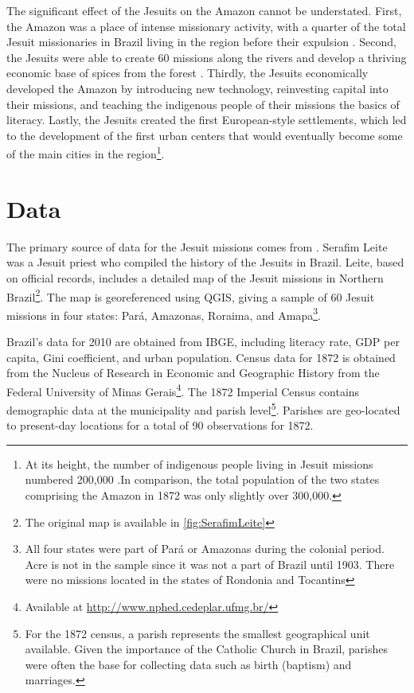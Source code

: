 \documentclass{article}
\begin{document}
The significant effect of the Jesuits on the Amazon cannot be understated. 
First, the Amazon was a place of intense missionary activity, with a quarter of the total Jesuit missionaries in Brazil living in the region before their expulsion \parencite{Bethell1984-eo}. 
Second, the Jesuits were able to create 60 missions along the rivers and develop a thriving economic base of spices from the forest \parencite{Hemming1987-vj}. 
Thirdly, the Jesuits economically developed the Amazon by introducing new technology, reinvesting capital into their missions, and teaching the indigenous people of their missions the basics of literacy. 
Lastly, the Jesuits created the first European-style settlements, which led to the development of the first urban centers that would eventually become some of the main cities in the region\footnote{
  At its height, the number of indigenous people living in Jesuit missions numbered 200,000 \parencite{Bethell1984-eo, Alden1996-id}.In comparison, the total population of the two states comprising the Amazon in 1872 was only slightly over 300,000.}. 


\section{Data}

The primary source of data for the Jesuit missions comes from \textcite{Leite1943-dy}. Serafim Leite was a Jesuit priest who compiled the history of the Jesuits in Brazil. 
Leite, based on official records, includes a detailed map of the Jesuit missions in Northern Brazil\footnote{
  The original map is available in \autoref{fig:SerafimLeite}}. 
The map is georeferenced using QGIS, giving a sample of 60 Jesuit missions in four states: Pará, Amazonas, Roraima, and Amapa\footnote{
  All four states were part of Pará or Amazonas during the colonial period. Acre is not in the sample since it was not a part of Brazil until 1903. There were no missions located in the states of Rondonia and Tocantins}.

Brazil's data for 2010 are obtained from IBGE, including literacy rate, GDP per capita, Gini coefficient, and urban population. 
Census data for 1872 is obtained from the Nucleus of Research in Economic and Geographic History from the Federal University of Minas Gerais\footnote{
  Available at \url{http://www.nphed.cedeplar.ufmg.br/}}. 
The 1872 Imperial Census contains demographic data at the municipality and parish level\footnote{
  For the 1872 census, a parish represents the smallest geographical unit available. Given the importance of the Catholic Church in Brazil, parishes were often the base for collecting data such as birth (baptism) and marriages.}.
Parishes are geo-located to present-day locations for a total of 90 observations for 1872. 
\end{document}
